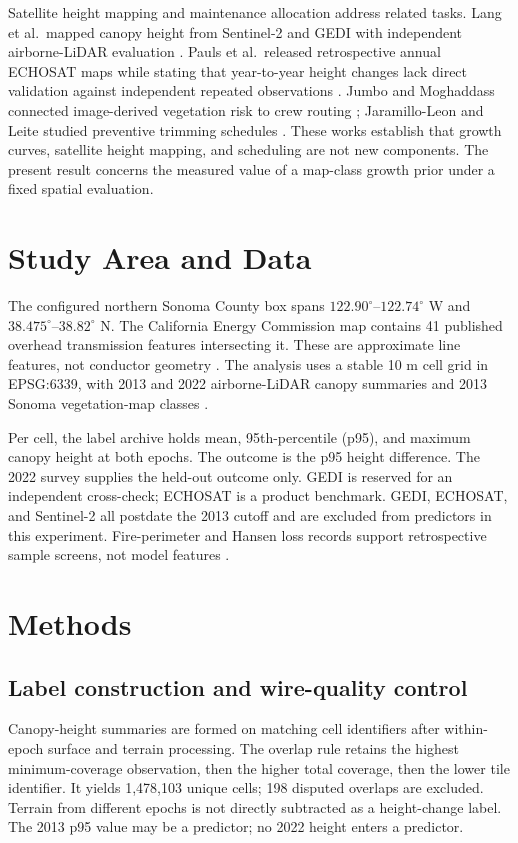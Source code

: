 \documentclass[11pt]{article}
\begin{document}
Satellite height mapping and maintenance allocation address related tasks.
Lang et al.\ mapped canopy height from Sentinel-2 and GEDI with independent
airborne-LiDAR evaluation \cite{lang2023}. Pauls et al.\ released
retrospective annual ECHOSAT maps while stating that year-to-year height
changes lack direct validation against independent repeated observations
\cite{pauls2026}. Jumbo and Moghaddass connected image-derived vegetation
risk to crew routing \cite{jumbo2022}; Jaramillo-Leon and Leite studied
preventive trimming schedules \cite{jaramillo2022}. These works establish
that growth curves, satellite height mapping, and scheduling are not
new components. The present result concerns the measured value of a
map-class growth prior under a fixed spatial evaluation.

\section{Study Area and Data}
The configured northern Sonoma County box spans $122.90^\circ$--$122.74^\circ$
W and $38.475^\circ$--$38.82^\circ$ N. The California Energy Commission
map contains 41 published overhead transmission features intersecting it.
These are approximate line features, not conductor geometry \cite{cecsource}.
The analysis uses a stable 10 m cell grid in EPSG:6339, with 2013 and 2022
airborne-LiDAR canopy summaries and 2013 Sonoma vegetation-map classes
\cite{sonomaveg}.

Per cell, the label archive holds mean, 95th-percentile (p95), and
maximum canopy height at both epochs. The outcome is the p95 height
difference. The 2022 survey supplies the held-out outcome only. GEDI is
reserved for an independent cross-check; ECHOSAT is a product benchmark.
GEDI, ECHOSAT, and Sentinel-2 all postdate the 2013 cutoff and are excluded
from predictors in this experiment. Fire-perimeter and Hansen loss records
support retrospective sample screens, not model features
\cite{frapsource,mtbssource,hansensource}.

\section{Methods}
\subsection{Label construction and wire-quality control}
Canopy-height summaries are formed on matching cell identifiers after
within-epoch surface and terrain processing. The overlap rule retains
the highest minimum-coverage observation, then the higher total coverage,
then the lower tile identifier. It yields 1,478,103 unique cells; 198
disputed overlaps are excluded. Terrain from different epochs is not
directly subtracted as a height-change label. The 2013 p95 value may be
a predictor; no 2022 height enters a predictor.
\end{document}
